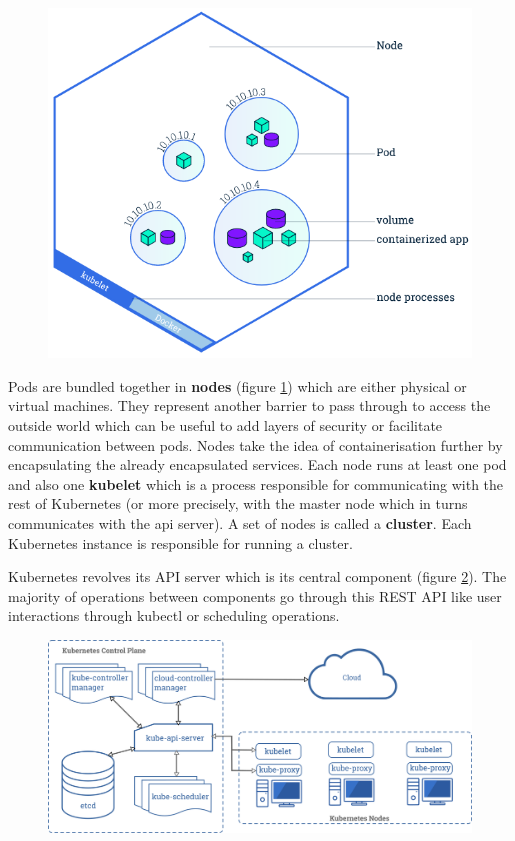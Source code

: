 \begin{figure}[h]
	\centering
	\includegraphics[scale=0.5]{./imgs/node-overview.png}
	\label{fig:node-overview}
\end{figure}

Pods are bundled together in \textbf{nodes} (figure \ref{fig:node-overview})
which are either physical or virtual machines. They represent another barrier
to pass through to access the outside world which can be useful to add layers
of security or facilitate communication between pods. Nodes take the idea of
containerisation further by encapsulating the already encapsulated services.
Each node runs at least one pod and also one \textbf{kubelet} which is a
process responsible for communicating with the rest of Kubernetes (or more
precisely, with the master node which in turns communicates with the api
server). A set of nodes is called a \textbf{cluster}. Each Kubernetes instance
is responsible for running a cluster.

Kubernetes revolves its API server which is its central component (figure
\ref{fig:kube-components}). The majority of operations between components go
through this REST API like user interactions through kubectl or scheduling
operations.

\begin{figure}[h]
	\centering
	\includegraphics[width=\textwidth]{./imgs/components-of-kubernetes.png}
	\label{fig:kube-components}
\end{figure}

